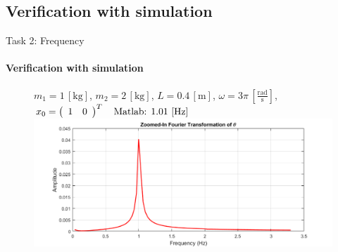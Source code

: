 \subsection{Verification with simulation}
\begin{frame}{Task 2: Frequency}
	\framesubtitle{Verification with simulation}
	\begin{figure}[H]
		\centering
		$m_1 = 1\,\left[\mathrm{kg}\right]$, $m_2 = 2\,\left[\mathrm{kg}\right]$, $L = 0.4\,\left[\mathrm{m}\right]$, $\omega = 3\pi\,\left[\mathrm{\frac{rad}{s}}\right]$, $x_0 = \left(\begin{array}{c c}
		1 & 0
		\end{array}\right)^T \quad \text{Matlab: }1.01\,\left[\mathrm{Hz}\right]$\\ [0.5cm]
		\includegraphics[width=1\textwidth]{pics/frequency.png}
	\end{figure}
\end{frame}